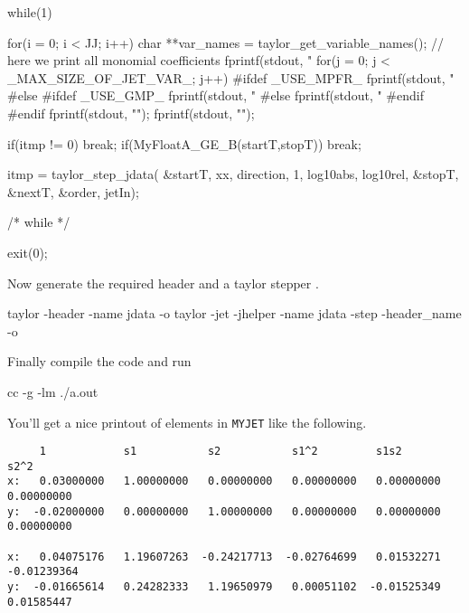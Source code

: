 \documentclass[10pt]{article}
\theoremstyle{remark}
\newcommand{\myjet}{{\tt MY\symbol{95}JET}}
\newcommand{\inputfile}{}
\newcommand{\mainfile}{}
\newcommand{\odecfile}{}
\newcommand{\odehfile}{}
\begin{document}
\begin{code}[title={File: \mainfile{}}]
{    	 while(1)  {
    	   for(i = 0; i < JJ; i++) {
    	     char **var_names = taylor_get_variable_names();
    	     // here we print all monomial coefficients	   	     
    	     fprintf(stdout, "%
    	     for(j = 0; j < _MAX_SIZE_OF_JET_VAR_; j++) {
    #ifdef _USE_MPFR_	 	       
    	       fprintf(stdout, "%
    #else
    #ifdef _USE_GMP_
    	       fprintf(stdout, "%
    #else
    	       fprintf(stdout, "%
    #endif
    #endif	       
    	     }
    	     fprintf(stdout, "\n");	     
    	   }
    	   fprintf(stdout, "\n");	     	   
    	   
    	   if(itmp != 0) {break;} 
    	   if(MyFloatA_GE_B(startT,stopT)) { break;}
    	   
    	   itmp = taylor_step_jdata( &startT, xx, direction, 1, 
    	                             log10abs, log10rel, 
    	                             &stopT, &nextT, &order, jetIn);
    
    	 }  /* while */
    	 
    	 exit(0); 
     }   
\end{code}
Now generate the required header \odehfile{} and a taylor stepper \odecfile{}.
\begin{command}
   taylor -header -name jdata -o \odehfile{} \inputfile{} 
   taylor -jet -jhelper -name jdata -step -header_name \odehfile{} \inputfile{} -o \odecfile{}
\end{command}
Finally compile the code and run
\begin{command}
    cc -g \odecfile{} \mainfile{} -lm
    ./a.out
\end{command}
You'll get a nice printout of elements in \myjet{} like the following.
\begin{verbatim}
     1            s1           s2           s1^2         s1s2         s2^2         
x:   0.03000000   1.00000000   0.00000000   0.00000000   0.00000000   0.00000000 
y:  -0.02000000   0.00000000   1.00000000   0.00000000   0.00000000   0.00000000 

x:   0.04075176   1.19607263  -0.24217713  -0.02764699   0.01532271  -0.01239364 
y:  -0.01665614   0.24282333   1.19650979   0.00051102  -0.01525349   0.01585447 
\end{verbatim}
\end{document}
